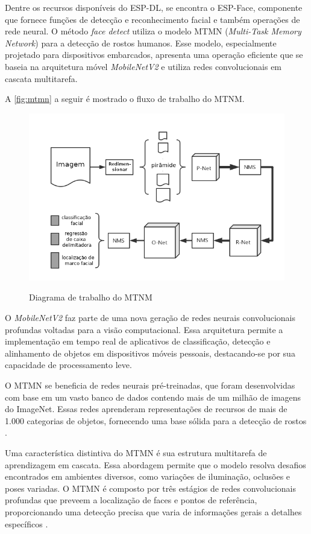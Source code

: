 Dentre os recursos disponíveis do ESP-DL, se encontra o 
ESP-Face, componente que fornece funções de detecção e 
reconhecimento facial e também operações de rede neural. 
O método \textit{face detect} utiliza o modelo MTMN (\textit{Multi-Task 
Memory Network}) para a detecção de rostos humanos. 
Esse modelo, especialmente projetado para dispositivos 
embarcados, apresenta uma operação eficiente que se 
baseia na arquitetura móvel \textit{MobileNetV2} e utiliza 
redes convolucionais em cascata multitarefa.

A \autoref{fig:mtmn} a seguir é mostrado o fluxo de trabalho do MTNM.

\begin{figure}[h!]
    \centering
    \caption{Diagrama de trabalho do MTNM}
    \includegraphics[scale=0.5]{figuras/mtmn.png}
    \label{fig:mtmn}
    \centering
\end{figure}

O \textit{MobileNetV2} faz parte de uma nova geração de redes 
neurais convolucionais profundas voltadas para a 
visão computacional. Essa arquitetura permite a 
implementação em tempo real de aplicativos de 
classificação, detecção e alinhamento de objetos 
em dispositivos móveis pessoais, destacando-se por 
sua capacidade de processamento leve.

O MTMN se beneficia de redes neurais pré-treinadas, 
que foram desenvolvidas com base em um vasto banco de 
dados contendo mais de um milhão de imagens do ImageNet. 
Essas redes aprenderam representações de recursos de 
mais de 1.000 categorias de objetos, fornecendo uma 
base sólida para a detecção de rostos \cite{luna2022}.

Uma característica distintiva do MTMN é sua estrutura 
multitarefa de aprendizagem em cascata. Essa abordagem 
permite que o modelo resolva desafios encontrados em 
ambientes diversos, como variações de iluminação, 
oclusões e poses variadas. O MTMN é composto por três 
estágios de redes convolucionais profundas que preveem a 
localização de faces e pontos de referência, proporcionando 
uma detecção precisa que varia de informações gerais a 
detalhes específicos \cite{luna2022}.

